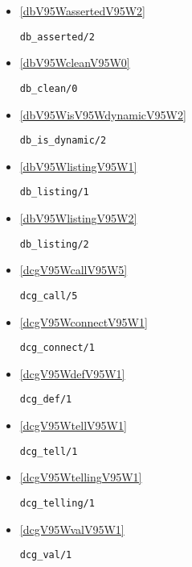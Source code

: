 \begin{itemize}
\item \ref{dbV95WassertedV95W2} 
\begin{verbatim}
db_asserted/2
\end{verbatim}

\item \ref{dbV95WcleanV95W0} 
\begin{verbatim}
db_clean/0
\end{verbatim}

\item \ref{dbV95WisV95WdynamicV95W2} 
\begin{verbatim}
db_is_dynamic/2
\end{verbatim}

\item \ref{dbV95WlistingV95W1} 
\begin{verbatim}
db_listing/1
\end{verbatim}

\item \ref{dbV95WlistingV95W2} 
\begin{verbatim}
db_listing/2
\end{verbatim}

\item \ref{dcgV95WcallV95W5} 
\begin{verbatim}
dcg_call/5
\end{verbatim}

\item \ref{dcgV95WconnectV95W1} 
\begin{verbatim}
dcg_connect/1
\end{verbatim}

\item \ref{dcgV95WdefV95W1} 
\begin{verbatim}
dcg_def/1
\end{verbatim}

\item \ref{dcgV95WtellV95W1} 
\begin{verbatim}
dcg_tell/1
\end{verbatim}

\item \ref{dcgV95WtellingV95W1} 
\begin{verbatim}
dcg_telling/1
\end{verbatim}

\item \ref{dcgV95WvalV95W1} 
\begin{verbatim}
dcg_val/1
\end{verbatim}


\end{itemize}
